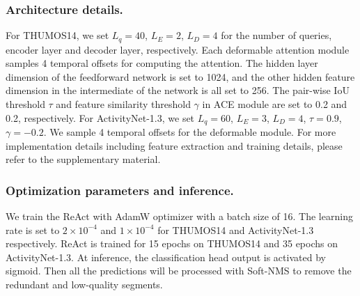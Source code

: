 \documentclass[runningheads]{llncs}
\def\name{ReAct }
\def\cls{ACE }
\begin{document}
\subsubsection{Architecture details.}
For THUMOS14, we set $L_q=40$, $L_E=2$, $L_D=4$ for the number of queries, encoder layer and decoder layer, respectively. Each deformable attention module samples 4 temporal offsets for computing the attention. The hidden layer dimension of the feedforward network is set to 1024, and the other hidden feature dimension in the intermediate of the network is all set to 256. The pair-wise IoU threshold $\tau$ and feature similarity threshold $\gamma$ in \cls module are set to 0.2 and 0.2, respectively. 
For ActivityNet-1.3, we set $L_q=60$, $L_E=3$, $L_D=4$, $\tau=0.9$, $\gamma=-0.2$. We sample 4 temporal offsets for the deformable module. 
For more implementation details including feature extraction and training details, please refer to the supplementary material.


\subsubsection{Optimization parameters and inference.} We train the \name with AdamW optimizer with a batch size of 16. The learning rate is set to $2 \times 10^{-4}$ and $1 \times 10^{-4}$ for THUMOS14 and ActivityNet-1.3 respectively. \name is trained for 15 epochs on THUMOS14 and 35 epochs on ActivityNet-1.3. At inference, the classification head output is activated by sigmoid. Then all the predictions will be processed with Soft-NMS\cite{bodla2017soft} to remove the redundant and low-quality segments.
\end{document}
